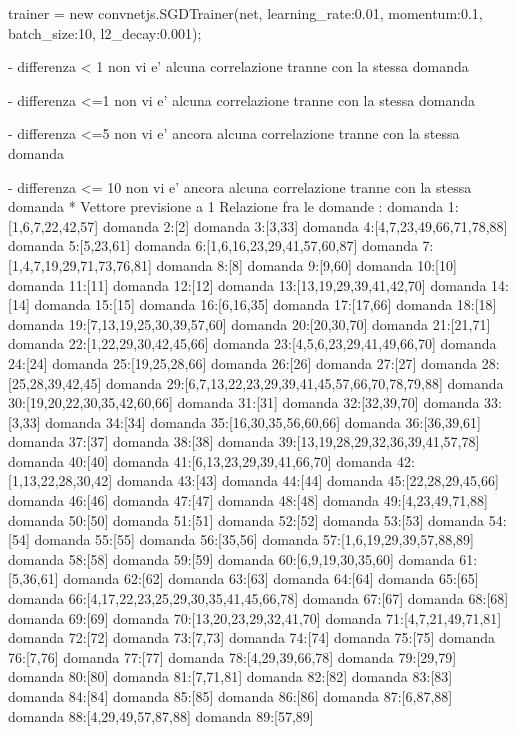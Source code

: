 trainer = new convnetjs.SGDTrainer(net, {learning_rate:0.01, momentum:0.1, batch_size:10, l2_decay:0.001});

- differenza < 1 non vi e' alcuna correlazione tranne con la stessa domanda

- differenza <=1 non vi e' alcuna correlazione tranne con la stessa domanda

- differenza <=5 non vi e' ancora alcuna correlazione tranne con la stessa domanda

- differenza <= 10 non vi e' ancora alcuna correlazione tranne con la stessa domanda
* Vettore previsione a 1
Relazione fra le domande :
domanda 1:[1,6,7,22,42,57]
domanda 2:[2]
domanda 3:[3,33]
domanda 4:[4,7,23,49,66,71,78,88]
domanda 5:[5,23,61]
domanda 6:[1,6,16,23,29,41,57,60,87]
domanda 7:[1,4,7,19,29,71,73,76,81]
domanda 8:[8]
domanda 9:[9,60]
domanda 10:[10]
domanda 11:[11]
domanda 12:[12]
domanda 13:[13,19,29,39,41,42,70]
domanda 14:[14]
domanda 15:[15]
domanda 16:[6,16,35]
domanda 17:[17,66]
domanda 18:[18]
domanda 19:[7,13,19,25,30,39,57,60]
domanda 20:[20,30,70]
domanda 21:[21,71]
domanda 22:[1,22,29,30,42,45,66]
domanda 23:[4,5,6,23,29,41,49,66,70]
domanda 24:[24]
domanda 25:[19,25,28,66]
domanda 26:[26]
domanda 27:[27]
domanda 28:[25,28,39,42,45]
domanda 29:[6,7,13,22,23,29,39,41,45,57,66,70,78,79,88]
domanda 30:[19,20,22,30,35,42,60,66]
domanda 31:[31]
domanda 32:[32,39,70]
domanda 33:[3,33]
domanda 34:[34]
domanda 35:[16,30,35,56,60,66]
domanda 36:[36,39,61]
domanda 37:[37]
domanda 38:[38]
domanda 39:[13,19,28,29,32,36,39,41,57,78]
domanda 40:[40]
domanda 41:[6,13,23,29,39,41,66,70]
domanda 42:[1,13,22,28,30,42]
domanda 43:[43]
domanda 44:[44]
domanda 45:[22,28,29,45,66]
domanda 46:[46]
domanda 47:[47]
domanda 48:[48]
domanda 49:[4,23,49,71,88]
domanda 50:[50]
domanda 51:[51]
domanda 52:[52]
domanda 53:[53]
domanda 54:[54]
domanda 55:[55]
domanda 56:[35,56]
domanda 57:[1,6,19,29,39,57,88,89]
domanda 58:[58]
domanda 59:[59]
domanda 60:[6,9,19,30,35,60]
domanda 61:[5,36,61]
domanda 62:[62]
domanda 63:[63]
domanda 64:[64]
domanda 65:[65]
domanda 66:[4,17,22,23,25,29,30,35,41,45,66,78]
domanda 67:[67]
domanda 68:[68]
domanda 69:[69]
domanda 70:[13,20,23,29,32,41,70]
domanda 71:[4,7,21,49,71,81]
domanda 72:[72]
domanda 73:[7,73]
domanda 74:[74]
domanda 75:[75]
domanda 76:[7,76]
domanda 77:[77]
domanda 78:[4,29,39,66,78]
domanda 79:[29,79]
domanda 80:[80]
domanda 81:[7,71,81]
domanda 82:[82]
domanda 83:[83]
domanda 84:[84]
domanda 85:[85]
domanda 86:[86]
domanda 87:[6,87,88]
domanda 88:[4,29,49,57,87,88]
domanda 89:[57,89]

